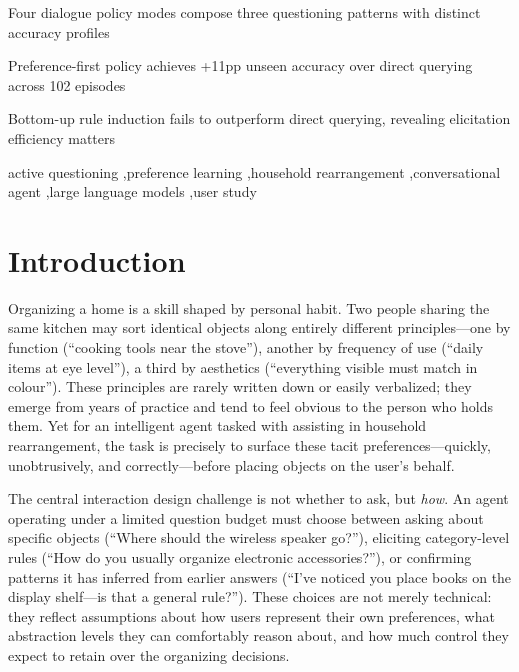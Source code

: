 \documentclass[a4paper,fleqn]{cas-sc}
\begin{document}
\begin{highlights}
\item Four dialogue policy modes compose three questioning patterns with distinct accuracy profiles
\item Preference-first policy achieves +11pp unseen accuracy over direct querying across 102 episodes
\item Bottom-up rule induction fails to outperform direct querying, revealing elicitation efficiency matters
\end{highlights}

\begin{keywords}
active questioning \sep preference learning \sep household rearrangement \sep conversational agent \sep large language models \sep user study
\end{keywords}

\maketitle

\section{Introduction}\label{sec:intro}

Organizing a home is a skill shaped by personal habit. Two people sharing the same kitchen may sort identical objects along entirely different principles---one by function (``cooking tools near the stove''), another by frequency of use (``daily items at eye level''), a third by aesthetics (``everything visible must match in colour''). These principles are rarely written down or easily verbalized; they emerge from years of practice and tend to feel obvious to the person who holds them. Yet for an intelligent agent tasked with assisting in household rearrangement, the task is precisely to surface these tacit preferences---quickly, unobtrusively, and correctly---before placing objects on the user's behalf.

The central interaction design challenge is not whether to ask, but \emph{how}. An agent operating under a limited question budget must choose between asking about specific objects (``Where should the wireless speaker go?''), eliciting category-level rules (``How do you usually organize electronic accessories?''), or confirming patterns it has inferred from earlier answers (``I've noticed you place books on the display shelf---is that a general rule?''). These choices are not merely technical: they reflect assumptions about how users represent their own preferences, what abstraction levels they can comfortably reason about, and how much control they expect to retain over the organizing decisions.
\end{document}
